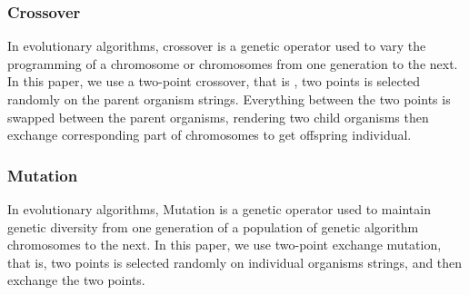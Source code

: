 \subsubsection{Crossover}
In evolutionary algorithms, crossover is a genetic operator used to vary the
programming of a chromosome or chromosomes from one generation to the next.  In
this paper, we use a two-point crossover, that is , two points is selected
randomly on the parent organism strings. Everything between the two points is
swapped between the parent organisms, rendering two child organisms then
exchange corresponding part of chromosomes to get offspring individual.


\subsubsection{Mutation}
In evolutionary algorithms, Mutation is a genetic operator used to maintain
genetic diversity from one generation of a population of genetic algorithm
chromosomes to the next.  In this paper, we use two-point exchange mutation,
that is, two points is selected randomly on individual organisms strings, and
then exchange the two points.
